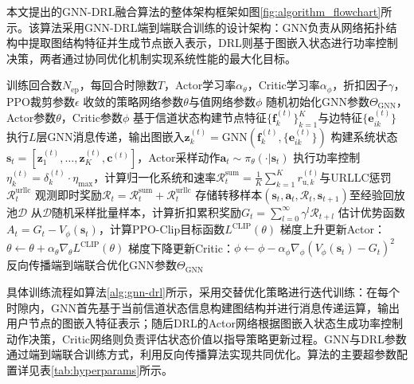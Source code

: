 本文提出的GNN-DRL融合算法的整体架构框架如图\ref{fig:algorithm_flowchart}所示。该算法采用GNN-DRL端到端联合训练的设计架构：GNN负责从网络拓扑结构中提取图结构特征并生成节点嵌入表示，DRL则基于图嵌入状态进行功率控制决策，两者通过协同优化机制实现系统性能的最大化目标。
\renewcommand{\thealgorithm}{4-1}
\begin{algorithm}[h]
\caption{基于GNN-DRL的CF-mMIMO功率控制算法}
\label{alg:gnn-drl}
\begin{algorithmic}[1]
\Require 训练回合数$N_{\text{ep}}$，每回合时隙数$T$，Actor学习率$\alpha_{\theta}$，Critic学习率$\alpha_{\phi}$，折扣因子$\gamma$，PPO裁剪参数$\epsilon$
\Ensure 收敛的策略网络参数$\theta$与值网络参数$\phi$
\State 随机初始化GNN参数$\Theta_{\text{GNN}}$，Actor参数$\theta$，Critic参数$\phi$
        \State 基于信道状态构建节点特征$\{\mathbf{f}_{k}^{(t)}\}_{k=1}^{K}$与边特征$\{\mathbf{e}_{ik}^{(t)}\}$
        \State 执行$L$层GNN消息传递，输出图嵌入$\mathbf{z}_{k}^{(t)} = \text{GNN}(\mathbf{f}_{k}^{(t)}, \{\mathbf{e}_{ik}^{(t)}\})$
        \State 构建系统状态$\mathbf{s}_{t} = [\mathbf{z}_{1}^{(t)}, \ldots, \mathbf{z}_{K}^{(t)}, \mathbf{c}^{(t)}]$，Actor采样动作$\mathbf{a}_{t} \sim \pi_{\theta}(\cdot|\mathbf{s}_{t})$
        \State 执行功率控制$\eta_{k}^{(t)} = \delta_{k}^{(t)} \cdot \eta_{\max}$，计算归一化系统和速率$\mathcal{R}_{t}^{\text{sum}} = \frac{1}{K}\sum_{k=1}^{K}r_{\text{u},k}^{(t)}$与URLLC惩罚$\mathcal{R}_{t}^{\text{urllc}}$
        \State 观测即时奖励$\mathcal{R}_{t} = \mathcal{R}_{t}^{\text{sum}} + \mathcal{R}_{t}^{\text{urllc}}$
        \State 存储转移样本$(\mathbf{s}_{t}, \mathbf{a}_{t}, \mathcal{R}_{t}, \mathbf{s}_{t+1})$至经验回放池$\mathcal{D}$
    \EndFor
    \State 从$\mathcal{D}$随机采样批量样本，计算折扣累积奖励$G_{t} = \sum_{l=0}^{\infty}\gamma^{l}\mathcal{R}_{t+l}$
    \State 估计优势函数$A_{t} = G_{t} - V_{\phi}(\mathbf{s}_{t})$，计算PPO-Clip目标函数$L^{\text{CLIP}}(\theta)$
    \State 梯度上升更新Actor：$\theta \leftarrow \theta + \alpha_{\theta}\nabla_{\theta}L^{\text{CLIP}}(\theta)$
    \State 梯度下降更新Critic：$\phi \leftarrow \phi - \alpha_{\phi}\nabla_{\phi}(V_{\phi}(\mathbf{s}_{t})-G_{t})^{2}$
    \State 反向传播端到端联合优化GNN参数$\Theta_{\text{GNN}}$
\EndFor
\end{algorithmic}
\end{algorithm}

具体训练流程如算法\ref{alg:gnn-drl}所示，采用交替优化策略进行迭代训练：在每个时隙内，GNN首先基于当前信道状态信息构建图结构并进行消息传递运算，输出用户节点的图嵌入特征表示；随后DRL的Actor网络根据图嵌入状态生成功率控制动作决策，Critic网络则负责评估状态价值以指导策略更新过程。GNN与DRL参数通过端到端联合训练方式，利用反向传播算法实现共同优化。算法的主要超参数配置详见表\ref{tab:hyperparams}所示。

